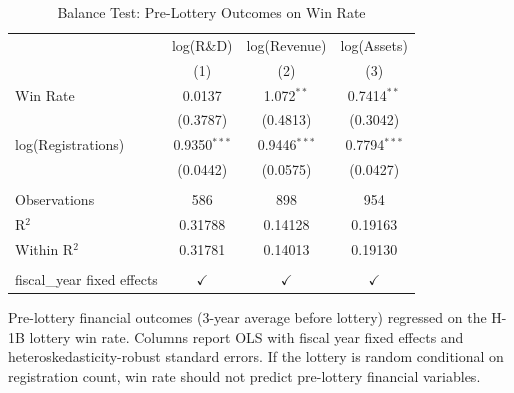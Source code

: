 \begin{table}[htbp]
   \caption{\label{tab:balance} Balance Test: Pre-Lottery Outcomes on Win Rate}
   \bigskip
   \centering
   \begin{tabular}{lccc}
      \toprule
                                  & log(R\&D)      & log(Revenue)   & log(Assets)\\  
                                  & (1)            & (2)            & (3)\\  
      \midrule 
      Win Rate                    & 0.0137         & 1.072$^{**}$   & 0.7414$^{**}$\\   
                                  & (0.3787)       & (0.4813)       & (0.3042)\\   
      log(Registrations)          & 0.9350$^{***}$ & 0.9446$^{***}$ & 0.7794$^{***}$\\   
                                  & (0.0442)       & (0.0575)       & (0.0427)\\   
       \\
      Observations                & 586            & 898            & 954\\  
      R$^2$                       & 0.31788        & 0.14128        & 0.19163\\  
      Within R$^2$                & 0.31781        & 0.14013        & 0.19130\\  
       \\
      fiscal\_year fixed effects  & $\checkmark$   & $\checkmark$   & $\checkmark$\\   
      \bottomrule
   \end{tabular}
   
   \par \raggedright 
   Pre-lottery financial outcomes (3-year average before lottery) regressed on the H-1B lottery win rate. Columns report OLS with fiscal year fixed effects and heteroskedasticity-robust standard errors. If the lottery is random conditional on registration count, win rate should not predict pre-lottery financial variables.
\end{table}
